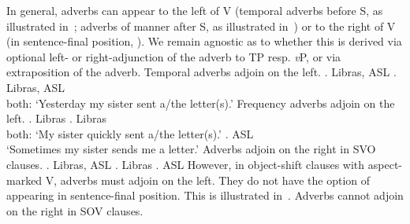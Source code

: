\documentclass[output=paper]{langscibook}
\begin{document}
In general, adverbs can appear to the left of V (temporal
adverbs before S, as illustrated in~; adverbs of manner after S, as
illustrated in~) or to the right of V (in sentence-final position,
). We remain agnostic as to whether this is derived via optional
left- or right-adjunction of the adverb to TP resp. \textit{v}P, or via
extraposition of the adverb.
\ea 
    \label{lasz:ex:20}
    Temporal adverbs adjoin on the left.
    \ea 
        \textbf{}   \laszPlain{} .
        \hfill 
        \cmark Libras, \cmark ASL 
    \ex 
        \textbf{}    \laszAsp{}.
        \hfill 
        \cmark Libras, \cmark ASL 
        \\ 
        both: ‘Yesterday my sister sent a/the letter(s).’
    \z 
\ex 
    \label{lasz:ex:21}
    Frequency adverbs adjoin on the left.
    \ea 
          \textbf{} \laszPlain{} .
        \hfill 
        \cmark Libras 
    \ex 
          \textbf{}  \laszAsp{}.
        \hfill 
        \cmark Libras 
        \\ 
        both: ‘My sister quickly sent a/the letter(s).’
    \ex 
          \textbf{}  .
        \hfill 
        \cmark ASL 
        \\ 
        ‘Sometimes my sister sends me a letter.’
    \z 
\ex 
    \label{lasz:ex:22}
    Adverbs adjoin on the right in SVO clauses.
    \ea 
          \laszPlain{}  \textbf{}.
        \hfill 
        \cmark Libras, \cmark ASL 
    \ex 
          \laszPlain{}  \textbf{}.
        \hfill 
        \cmark Libras 
    \ex 
            \textbf{}.
        \hfill 
        \cmark ASL 
    \z 
\z 
However, in object-shift clauses with aspect-marked V, adverbs must
adjoin on the left. They do not have the option of appearing in
sentence-final position. This is illustrated in~.
\ea 
    \label{lasz:ex:23}
    Adverbs cannot adjoin on the right in SOV\laszAsp{} clauses.
    \z 
\z 
\end{document}
